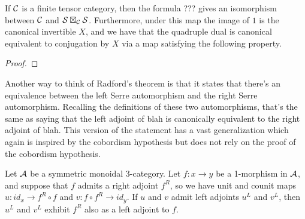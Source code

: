 \documentclass{amsart}
\begin{document}
\begin{theorem}
If $\mathcal C$ is a finite tensor category, then the formula ??? gives an isomorphism between $\mathcal C$ and $\mathcal S \boxtimes_\mathcal C \mathcal S$.  Furthermore, under this map the image of $1$ is the canonical invertible $X$, and we have that the quadruple dual is canonical equivalent to conjugation by $X$ via a map satisfying the following property.
\end{theorem}
\begin{proof}
\end{proof}

Another way to think of Radford's theorem is that it states that there's an equivalence between the left Serre automorphism and the right Serre automorphism.  Recalling the definitions of these two automorphisms, that's the same as saying that the left adjoint of blah is canonically equivalent to the right adjoint of blah.  This version of the statement has a vast generalization which again is inspired by the cobordism hypothesis but does not rely on the proof of the cobordism hypothesis.


\begin{proposition} \label{prop-ambiadjoints}
	Let $\mathcal A$ be a symmetric monoidal 3-category. Let $f: x \to y$ be a 1-morphism in $\mathcal A$, and suppose that $f$ admits a right adjoint $f^R$,  so we have unit and counit maps $u:id_x \to f^R \circ f$ and $v:f \circ f^R \to id_y$. If $u$ and $v$ admit left adjoints $u^L$ and $v^L$, then $u^L$ and $v^L$ exhibit $f^R$ also as a left adjoint to $f$. 
\end{proposition}
\end{document}
